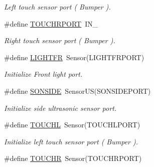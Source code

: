 \begin{DoxyCompactItemize}
\begin{DoxyCompactList}\small\item\em Left touch sensor port ( Bumper ). \item\end{DoxyCompactList}\item 
\hypertarget{fence_8nxc_ac16330478e7b003e00f37e90e0c5bdf6}{
\#define \hyperlink{fence_8nxc_ac16330478e7b003e00f37e90e0c5bdf6}{TOUCHRPORT}~IN\_}
\label{fence_8nxc_ac16330478e7b003e00f37e90e0c5bdf6}

\begin{DoxyCompactList}\small\item\em Right touch sensor port ( Bumper ). \item\end{DoxyCompactList}\item 
\hypertarget{fence_8nxc_a26fd581a2d8a8f58a30535495c8d0843}{
\#define \hyperlink{fence_8nxc_a26fd581a2d8a8f58a30535495c8d0843}{LIGHTFR}~Sensor(LIGHTFRPORT)}
\label{fence_8nxc_a26fd581a2d8a8f58a30535495c8d0843}

\begin{DoxyCompactList}\small\item\em Initialize Front light port. \item\end{DoxyCompactList}\item 
\hypertarget{fence_8nxc_aec1d71dea61f39acce761840c4ce0d27}{
\#define \hyperlink{fence_8nxc_aec1d71dea61f39acce761840c4ce0d27}{SONSIDE}~SensorUS(SONSIDEPORT)}
\label{fence_8nxc_aec1d71dea61f39acce761840c4ce0d27}

\begin{DoxyCompactList}\small\item\em Initialize side ultrasonic sensor port. \item\end{DoxyCompactList}\item 
\hypertarget{fence_8nxc_a98c4f75c182ff1c7c6f3fb288f4f3857}{
\#define \hyperlink{fence_8nxc_a98c4f75c182ff1c7c6f3fb288f4f3857}{TOUCHL}~Sensor(TOUCHLPORT)}
\label{fence_8nxc_a98c4f75c182ff1c7c6f3fb288f4f3857}

\begin{DoxyCompactList}\small\item\em Initialize left touch sensor port ( Bumper ). \item\end{DoxyCompactList}\item 
\hypertarget{fence_8nxc_a6537370af17fd38a56bcf670d8db23e3}{
\#define \hyperlink{fence_8nxc_a6537370af17fd38a56bcf670d8db23e3}{TOUCHR}~Sensor(TOUCHRPORT)}
\label{fence_8nxc_a6537370af17fd38a56bcf670d8db23e3}


\end{DoxyCompactItemize}

